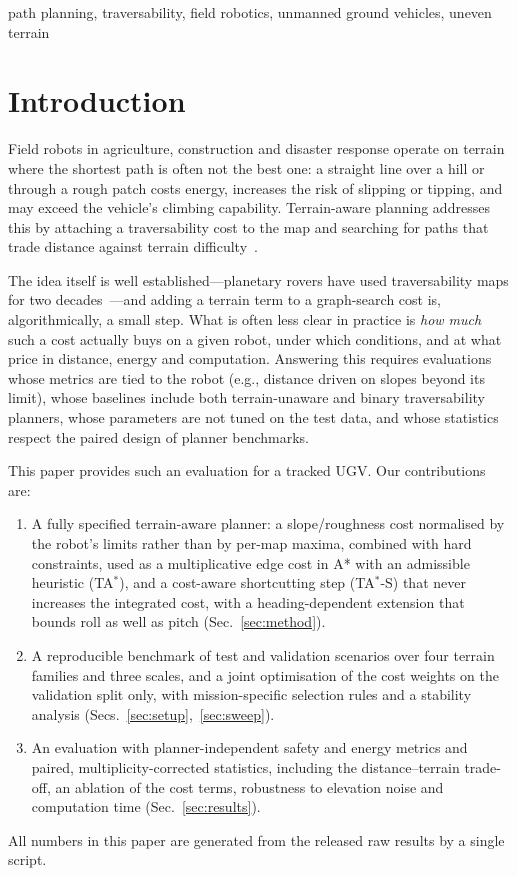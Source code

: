 \documentclass[conference]{IEEEtran}
\newcommand{\TAS}{TA$^*$-S}
\newcommand{\TA}{TA$^*$}
\begin{document}
\begin{IEEEkeywords}
path planning, traversability, field robotics, unmanned ground vehicles, uneven terrain
\end{IEEEkeywords}

\section{Introduction}
Field robots in agriculture, construction and disaster response operate on
terrain where the shortest path is often not the best one: a straight line
over a hill or through a rough patch costs energy, increases the risk of
slipping or tipping, and may exceed the vehicle's climbing capability.
Terrain-aware planning addresses this by attaching a traversability cost to
the map and searching for paths that trade distance against terrain
difficulty~\cite{papadakis2013survey,guastella2021review}.

The idea itself is well established---planetary rovers have used
traversability maps for two decades~\cite{goldberg2002gestalt,ferguson2006fielddstar}---and
adding a terrain term to a graph-search cost is, algorithmically, a small
step. What is often less clear in practice is \emph{how much} such a cost
actually buys on a given robot, under which conditions, and at what price
in distance, energy and computation. Answering this requires evaluations
whose metrics are tied to the robot (e.g., distance driven on slopes beyond
its limit), whose baselines include both terrain-unaware and binary
traversability planners, whose parameters are not tuned on the test data,
and whose statistics respect the paired design of planner benchmarks.

This paper provides such an evaluation for a tracked UGV. Our contributions are:
\begin{enumerate}
\item A fully specified terrain-aware planner: a slope/roughness cost
normalised by the robot's limits rather than by per-map maxima, combined
with hard constraints, used as a multiplicative edge cost in A* with an
admissible heuristic (\TA), and a cost-aware shortcutting step (\TAS) that
never increases the integrated cost, with a heading-dependent extension
that bounds roll as well as pitch (Sec.~\ref{sec:method}).
\item A reproducible benchmark of \nTest{} test and \nVal{} validation
scenarios over four terrain families and three scales, and a joint
optimisation of the cost weights on the validation split only, with
mission-specific selection rules and a stability analysis
(Secs.~\ref{sec:setup},~\ref{sec:sweep}).
\item An evaluation with planner-independent safety and energy metrics and
paired, multiplicity-corrected statistics, including the distance--terrain
trade-off, an ablation of the cost terms, robustness to elevation noise and
computation time (Sec.~\ref{sec:results}).
\end{enumerate}
All numbers in this paper are generated from the released raw results by a
single script.
\end{document}
